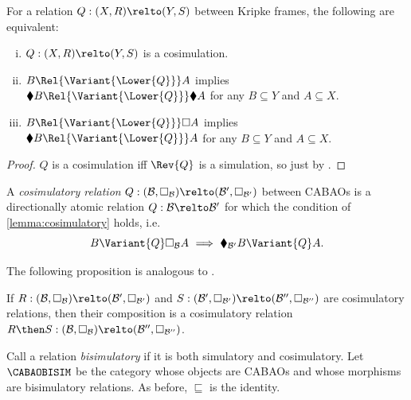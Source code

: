 \documentclass[a4paper,UKenglish,cleveref, autoref]{lipics-v2021}
\begin{document}
\begin{lemma}\label{lemma:cosim-black}\label{lemma:cosimulatory}
  For a relation \(Q : (X, R) \relto (Y, S)\) between Kripke frames,
  the following are equivalent:
  \begin{enumerate}[(i)]
  \item \(Q : (X, R) \relto (Y, S)\) is a cosimulation.
  \item \(B \Rel{\Variant{\Lower{Q}}} A\) implies
    \(\blacklozenge B \Rel{\Variant{\Lower{Q}}} \blacklozenge A\) for
    any \(B \subseteq Y\) and \(A \subseteq X\).
  \item \(B \Rel{\Variant{\Lower{Q}}} \Box A\) implies
    \(\blacklozenge B \Rel{\Variant{\Lower{Q}}} A\) for any
    \(B \subseteq Y\) and \(A \subseteq X\).
  \end{enumerate}
\end{lemma}
\begin{proof}
  \(Q\) is a cosimulation iff \(\Rev{Q}\) is a simulation, so just by
  .
\end{proof}

\begin{definition}
  A \emph{cosimulatory relation}
  \(Q : (\mathcal{B}, \Box_\mathcal{B}) \relto (\mathcal{B}',
  \Box_{\mathcal{B}'})\) between CABAOs is a directionally atomic
  relation \(Q : \mathcal{B} \relto \mathcal{B}'\) for which the
  condition of \cref{lemma:cosimulatory} holds, i.e.\
  \[
    B \Variant{Q} \Box_\mathcal{B} A\
    \Longrightarrow\
    \blacklozenge_{\mathcal{B}'} B \Variant{Q} A.
  \]
\end{definition}

The following proposition is analogous to
.

\begin{proposition}
  \label{proposition:cosimulatory-compose}
  If
  \(R : (\mathcal{B}, \Box_\mathcal{B}) \relto (\mathcal{B}',
  \Box_{\mathcal{B}'})\) and
  \(S : (\mathcal{B}', \Box_{\mathcal{B}'}) \relto (\mathcal{B}'',
  \Box_{\mathcal{B}''})\) are cosimulatory relations, then their composition
  is a cosimulatory relation
  \(R \then S : (\mathcal{B}, \Box_\mathcal{B}) \relto (\mathcal{B}'',
  \Box_{\mathcal{B}''})\).
\end{proposition}

Call a relation \emph{bisimulatory} if it is both simulatory and
cosimulatory. Let \(\CABAOBISIM\) be the category whose objects are
CABAOs and whose morphisms are bisimulatory relations. As before,
\(\sqsubseteq\) is the identity.
\end{document}
